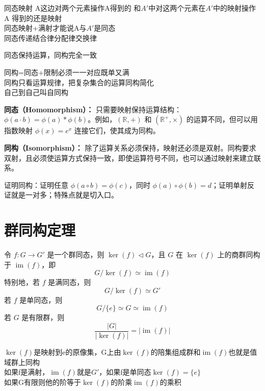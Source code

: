 \begin{note}[同态的定义]
同态映射 A这边对两个元素操作A得到的 和$A'$中对这两个元素在$A'$中的映射操作A 得到的还是映射 \\
同态映射+满射才能说A与$A'$是同态 \\
同态传递结合律分配律交换律
\end{note}

\begin{note}[同态同构的意义]
同态保持运算，同构完全一致
\end{note}

\begin{note}[同构]
同构=同态+限制必须一一对应既单又满 \\
同构只看运算规律，把复杂集合的运算同构简化 \\
自己到自己叫自同构
\end{note}

\begin{note}[构造同态同构的关键点]
\textbf{同态（Homomorphism）：} 只需要映射保持运算结构：$\phi(a\cdot b)=\phi(a)*\phi(b)$。例如，$(\mathbb{R},+)$ 和 $(\mathbb{R}^+,\times)$ 的运算不同，但可以用指数映射 $\phi(x)=e^x$ 连接它们，使其成为同构。

\textbf{同构（Isomorphism）：} 除了运算关系必须保持，映射还必须是双射。同构要求双射，且必须使运算方式保持一致，即使运算符号不同，也可以通过映射来建立联系。

证明同构：证明任意 $\phi(a\circ b)=\phi(c)$，同时 $\phi(a)\circ\phi(b)=d$；证明单射反证就是一对多；特殊点就是切入口。
\end{note}

\section{群同构定理}

\begin{theorem}[群同构第一定理（定理 1.2）]
令 $f:G\to G'$ 是一个群同态，则 $\ker(f)\triangleleft G$，且 $G$ 在 $\ker(f)$ 上的商群同构于 $\operatorname{im}(f)$，即
\[
G/\ker(f)\simeq\operatorname{im}(f)
\]
特别地，若 $f$ 是满同态，则
\[
G/\ker(f)\simeq G'
\]
若 $f$ 是单同态，则
\[
G/\{e\}\simeq G\simeq\operatorname{im}(f)
\]
若 $G$ 是有限群，则
\[
\frac{|G|}{|\ker(f)|}=|\operatorname{im}(f)|
\]
\end{theorem}

\begin{note}[群同构第一定理1 2]
$\ker(f)$是映射到e的原像集，G上由$\ker(f)$的陪集组成群和$\operatorname{im}(f)$也就是值域群上同构 \\
如果f是满射，$\operatorname{im}(f)$就是$G'$，如果f是单同态$\ker(f)=\{e\}$ \\
如果G有限则他的阶等于$\ker(f)$的阶乘$\operatorname{im}(f)$的乘积
\end{note}

